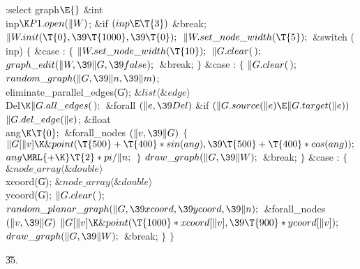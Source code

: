 \Y\B\4:select graph\X${}\E{}$\6
\&{int} \\{inp}${}\K\\{P1}.\\{open}(\|W){}$;\7
\&{if} ${}(\\{inp}\E\T{3}){}$\1\5
\&{break};\2\6
${}\|W.\\{init}(\T{0},\39\T{1000},\39\T{0});{}$\6
${}\|W.\\{set\_node\_width}(\T{5});{}$\6
\&{switch} (\\{inp})\5
${}\{{}$\1\6
\4\&{case} :\6
${}\{{}$\1\6
${}\|W.\\{set\_node\_width}(\T{10});{}$\6
${}\|G.\\{clear}(\,);{}$\6
${}\\{graph\_edit}(\|W,\39\|G,\39\\{false});{}$\6
\&{break};\6
\4${}\}{}$\2\6
\4\&{case} :\6
${}\{{}$\1\6
${}\|G.\\{clear}(\,);{}$\6
${}\\{random\_graph}(\|G,\39\|n,\39\|m){}$;\6
\\{eliminate\_parallel\_edges}(\|G);\7
${}\&{list}\langle\&{edge}\rangle{}$ \\{Del}${}\K\|G.\\{all\_edges}(\,);{}$\7
\&{forall} ${}(\|e,\39\\{Del}){}$\1\6
\&{if} ${}(\|G.\\{source}(\|e)\E\|G.\\{target}(\|e)){}$\1\5
${}\|G.\\{del\_edge}(\|e){}$;\2\2%
\7
\&{float} \\{ang}${}\K\T{0};{}$\7
\&{forall\_nodes} ${}(\|v,\39\|G){}$\5
${}\{{}$\1\6
${}\|G[\|v]\K\&{point}(\T{500}+\T{400}*\\{sin}(\\{ang}),\39\T{500}+\T{400}*%
\\{cos}(\\{ang}));{}$\6
${}\\{ang}\MRL{+{\K}}\T{2}*\\{pi}/\|n;{}$\6
\4${}\}{}$\2\6
${}\\{draw\_graph}(\|G,\39\|W);{}$\6
\&{break};\6
\4${}\}{}$\2\6
\4\&{case} :\6
${}\{{}$\1\6
${}\&{node\_array}\langle\&{double}\rangle{}$ \\{xcoord}(\|G);\6
${}\&{node\_array}\langle\&{double}\rangle{}$ \\{ycoord}(\|G);\7
${}\|G.\\{clear}(\,);{}$\6
${}\\{random\_planar\_graph}(\|G,\39\\{xcoord},\39\\{ycoord},\39\|n);{}$\6
\&{forall\_nodes} ${}(\|v,\39\|G){}$\1\5
${}\|G[\|v]\K\&{point}(\T{1000}*\\{xcoord}[\|v],\39\T{900}*\\{ycoord}[\|v]);{}$%
\2\6
${}\\{draw\_graph}(\|G,\39\|W);{}$\6
\&{break};\6
\4${}\}{}$\2\6
\4${}\}{}$\2\par
\U35.\fi

